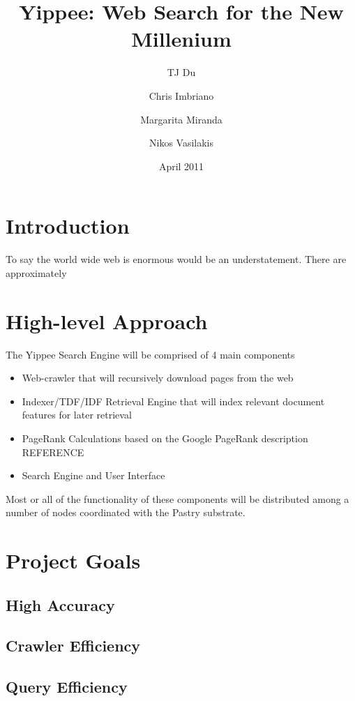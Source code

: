 \documentclass[11pt, twocolumn]{article}
\begin{document}
\title{Yippee: Web Search for the New Millenium}
\author{	TJ Du
	\and Chris Imbriano
	\and Margarita Miranda
	\and Nikos Vasilakis}
\date{April 2011}

\maketitle

\section{ Introduction }

To say the world wide web is enormous would be an understatement.  There are approximately 

\section{ High-level Approach }

The Yippee Search Engine will be comprised of 4 main components
\begin{itemize}
\item Web-crawler that will recursively download pages from the web
\item Indexer/TDF/IDF Retrieval Engine that will index relevant document features for later retrieval 
\item PageRank Calculations based on the Google PageRank description REFERENCE
\item Search Engine and User Interface
\end{itemize}

Most or all of the functionality of these components will be distributed among a number of nodes coordinated with the Pastry substrate.

\section{ Project Goals }

\subsection{ High Accuracy }
\subsection{ Crawler Efficiency }
\subsection{ Query Efficiency }
\end{document}
